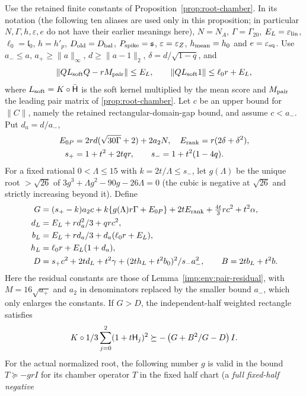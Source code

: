 \begin{proposition}
\label{imp:env:finite-gap-chamber}
Use the retained finite constants of
Proposition~\ref{prop:root-chamber}. In its notation (the
following ten aliases are used only in this proposition; in
particular $N,\Gamma,h,\varepsilon,e$ do not have their earlier
meanings here),
$N=N_A$, $\Gamma=\Gamma_{20}$, $E_L=\eps_{\rm lin}$,
$\ell_0=\mathfrak l_0$, $h=h'_p$, $D_{\rm old}=D_{\rm bal}$,
$P_{\rm spike}=\mathfrak s$, $\varepsilon=\eps_Z$,
$h_{\rm mean}=h_0$ and $e=\eps_{\rm sq}$.
Use
$a_-\le a$, $a_+\ge\|a\|_\infty$, $d\ge\|a-1\|_2$,
$\delta=d/\sqrt{1-q}$, and
\[
 \|QL_{\rm soft}Q-rM_{\rm pair}\|\le E_L,\qquad
 \|QL_{\rm soft}1\|\le\ell_0r+E_L,
\]
where $L_{\rm soft}=K\circ\Hbar$ is the soft kernel multiplied by the mean score and
$M_{\rm pair}$ the leading pair matrix of
\cref{prop:root-chamber}.
Let $c$ be an upper bound for $\|C\|$, namely the retained rectangular-domain-gap bound, and assume
$c<a_-$.  Put $d_a=d/a_-$,
\begin{align*}
 E_{0P}&=2rd(\sqrt{30\Gamma}+2)+2a_2N,
 \quad E_{\rm rank}=r(2\delta+\delta^2),\\
 s_+&=1+t^2+2tqr,\qquad s_-=1+t^2(1-4q).
\end{align*}
For a fixed rational $0<\Lambda\le15$ with $k=2t/\Lambda\le s_-$,
let $g(\Lambda)$ be the unique root $>\sqrt{26}$ of
$3g^3+\Lambda g^2-90g-26\Lambda=0$ (the cubic is negative at
$\sqrt{26}$ and strictly increasing beyond it). Define
\begin{align*}
 G&=(s_+-k)a_2c+k\{g(\Lambda)r\Gamma+E_{0P}\}
       +2tE_{\rm rank}+\tfrac{4t}{3}rc^2+t^2\alpha,\\
 d_L&=E_L+rd_a^2/3+qrc^2,\\
 b_L&=E_L+rd_a/3+d_a(\ell_0r+E_L),\\
 h_L&=\ell_0r+E_L(1+d_a),\\
 D&=s_+c^2+2td_L+t^2\gamma+
       \frac{(2th_L+t^2b_0)^2}{s_-a_-^2},
 \qquad B=2tb_L+t^2b.
\end{align*}
Here the residual constants are those of
Lemma~\ref{imp:env:pair-residual}, with $M=16\sqrt{a_+}$ and
$a_2$ in denominators replaced by the smaller bound $a_-$, which only enlarges the constants.
If $G>D$, the independent-half weighted rectangle satisfies
\[
 K\circ\frac13\sum_{j=0}^2(1+t\Hs j)^2
 \succeq-\left(G+\frac{B^2}{G-D}\right)I.
\]
For the actual normalized root, the following number $g$ is
valid in the bound $T\succeq-grI$ for its chamber operator $T$
in the fixed half chart (a \emph{full fixed-half negative
}
\end{proposition}
